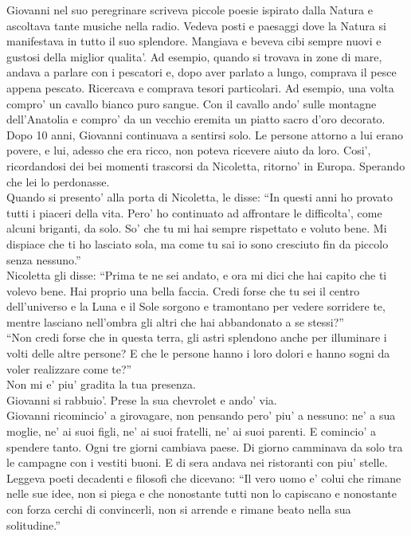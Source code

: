 Giovanni nel suo peregrinare scriveva piccole poesie ispirato dalla Natura e ascoltava tante musiche nella radio. Vedeva posti e paesaggi dove la Natura si manifestava in tutto il suo splendore. Mangiava e beveva cibi sempre nuovi e gustosi della miglior qualita'. Ad esempio, quando si trovava in zone di mare, andava a parlare con i pescatori e, dopo aver parlato a lungo, comprava il pesce appena pescato. Ricercava e comprava tesori particolari. Ad esempio, una volta compro' un cavallo bianco puro sangue. Con il cavallo ando' sulle montagne dell'Anatolia e compro' da un vecchio eremita un piatto sacro d'oro decorato.\\

Dopo 10 anni, Giovanni continuava a sentirsi solo. Le persone attorno a lui erano povere, e lui, adesso che era ricco, non poteva ricevere aiuto da loro. Cosi', ricordandosi dei bei momenti trascorsi da Nicoletta, ritorno' in Europa. Sperando che lei lo perdonasse.\\

Quando si presento' alla porta di Nicoletta, le disse: \enquote{In questi anni ho provato tutti i piaceri della vita. Pero' ho continuato ad affrontare le difficolta', come alcuni briganti, da solo. So' che tu mi hai sempre rispettato e voluto bene. Mi dispiace che ti ho lasciato sola, ma come tu sai io sono cresciuto fin da piccolo senza nessuno.}\\

Nicoletta gli disse: \enquote{Prima te ne sei andato, e ora mi dici che hai capito che ti volevo bene. Hai proprio una bella faccia. Credi forse che tu sei il centro dell'universo e la Luna e il Sole sorgono e tramontano per vedere sorridere te, mentre lasciano nell'ombra gli altri che hai abbandonato a se stessi?} \\
\enquote{Non credi forse che in questa terra, gli astri splendono anche per illuminare i volti delle altre persone? E che le persone hanno i loro dolori e hanno sogni da voler realizzare come te?}\\
Non mi e' piu' gradita la tua presenza.\\

Giovanni si rabbuio'. Prese la sua chevrolet e ando' via.\\

Giovanni ricomincio' a girovagare, non pensando pero' piu' a nessuno: ne' a sua moglie, ne' ai suoi figli, ne' ai suoi fratelli, ne' ai suoi parenti. E comincio' a spendere tanto. Ogni tre giorni cambiava paese. Di giorno camminava da solo tra le campagne con i vestiti buoni. E di sera andava nei ristoranti con piu' stelle.\\
Leggeva poeti decadenti e filosofi che dicevano: \enquote{Il vero uomo e' colui che rimane nelle sue idee, non si piega e che nonostante tutti non lo capiscano e nonostante con forza cerchi di convincerli, non si arrende e rimane beato nella sua solitudine.}\\

